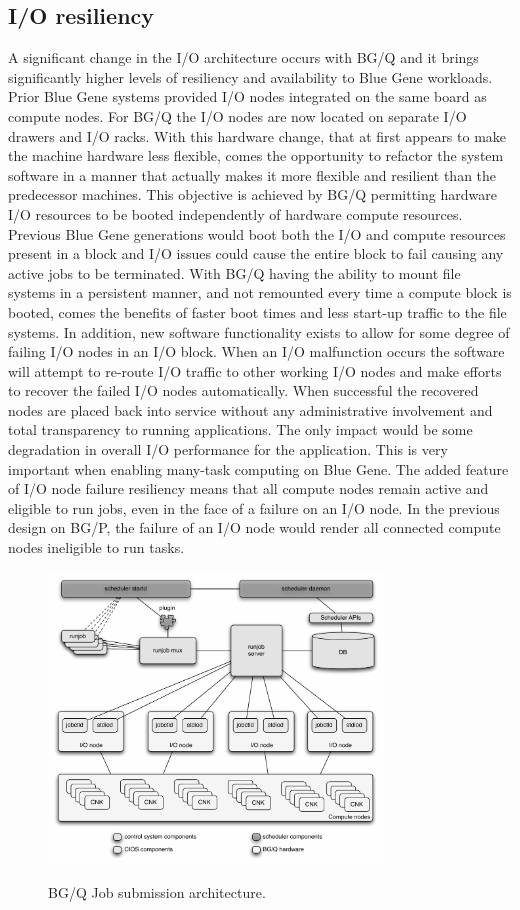 \subsection{I/O resiliency}
\label{sec:io}
A significant change in the I/O architecture occurs with BG/Q and it brings significantly higher levels of 
resiliency and availability to Blue Gene workloads. Prior Blue Gene systems provided I/O nodes integrated on
the same board as compute nodes. For BG/Q the I/O nodes are now located on separate I/O drawers and I/O racks. 
With this hardware change, that at first appears to make the machine hardware less flexible, comes the 
opportunity to refactor the system software in a manner that actually makes it more flexible and resilient 
than the predecessor machines. This objective is achieved by BG/Q permitting hardware I/O resources to be 
booted independently of hardware compute resources. Previous Blue Gene generations would boot both the I/O
and compute resources present in a block and I/O issues could cause the entire block to fail causing any 
active jobs to be terminated. With BG/Q having the ability to mount file systems in a persistent manner, 
and not remounted every time a compute block is booted, comes the benefits of faster boot times and less 
start-up traffic to the file systems. In addition, new software functionality exists to allow for some 
degree of failing I/O nodes in an I/O block. When an I/O malfunction occurs the software will attempt to
re-route I/O traffic to other working I/O nodes and make efforts to recover the failed I/O nodes automatically. 
When successful the recovered nodes are placed back into service without any administrative involvement
and total transparency to running applications.  The only impact would be some degradation in overall
I/O performance for the application. This is very important when enabling many-task computing on 
Blue Gene. The added feature of I/O node 
failure resiliency means that all compute nodes remain active and eligible to run jobs, even in the 
face of a failure on an I/O node.  In the previous design on BG/P, the failure of an I/O node would 
render all connected compute nodes ineligible to run tasks.

\begin{figure}[!t]
    \centering
    \caption{BG/Q Job submission architecture.}
    \includegraphics[width=3.5in]{jobsubmission}
    \label{fig:bgqjobsubmission}
\end{figure}

